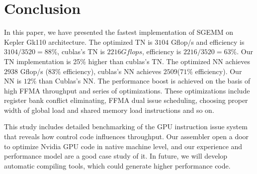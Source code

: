 \section{Conclusion}
\label{sec:conclusion}
In this paper, we have presented the fastest implementation of SGEMM on Kepler Gk110 architecture.
The optimized TN is $3104$ Gflop/s and efficiency is $3104/3520=88\%$, cublas's TN is $2216 Gflops$,
efficiency is $2216/3520=63\%$. Our TN implementation is 25\% higher than cublas's TN. 
The optimized NN achieves $2938$ Gflop/s ($83\%$ efficiency), cublas's NN achieves $2509$($71\%$
efficiency). Our NN is $12\%$ than Cublas's NN.
The performance boost is achieved on the basis of high FFMA throughput and series of optimizations.
These optimizations include register bank conflict eliminating, FFMA dual issue scheduling, choosing
proper width of global load and shared memory load instructions and so on.

This study includes detailed benchmarking of the GPU instruction issue system that
reveals how control code influences throughput. Our assembler open a door to optimize Nvidia GPU
code in native machine level, and our experience and performance model are a good case study of it.
In future, we will develop automatic compiling tools, which could generate higher performance code.
